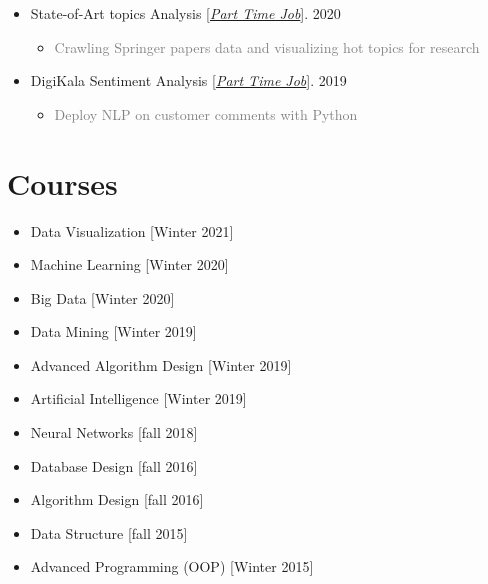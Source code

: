 \documentclass[10pt,a4paper,sans]{moderncv} %
\begin{document}
\begin{itemize}
		\item State-of-Art topics Analysis [\href{mailto:mbahmanabadi96@gmail.com}{\emph{Part Time Job}}]. \hfill 2020
		\begin{itemize}
			\item \textcolor{gray} {Crawling Springer papers data and visualizing hot topics for research}
		\end{itemize}
		
		\item DigiKala Sentiment Analysis [\href{mailto:mbahmanabadi96@gmail.com}{\emph{Part Time Job}}]. \hfill 2019
		\begin{itemize}
			\item \textcolor{gray} {Deploy NLP on customer comments with Python}
		\end{itemize}		

	\end{itemize}


	
	\section{Courses}
	\begin{multicols}{2}
		\begin{itemize}
			\item {} Data Visualization \hfill[Winter 2021]
			\item {} Machine Learning \hfill[Winter 2020]
			\item {} Big Data \hfill[Winter 2020]
			\item {} Data Mining \hfill[Winter 2019]
			\item {} Advanced Algorithm Design \hfill[Winter 2019]
			\item {} Artificial Intelligence \hfill[Winter 2019]
			\item {} Neural Networks \hfill[fall 2018]
			\item {} Database Design \hfill[fall 2016]
			\item {} Algorithm Design \hfill[fall 2016]	
			\item {} Data Structure \hfill[fall 2015]
			\item {} Advanced Programming (OOP) \hfill[Winter 2015]
		\end{itemize}
	\end{multicols}
	
\end{document}
